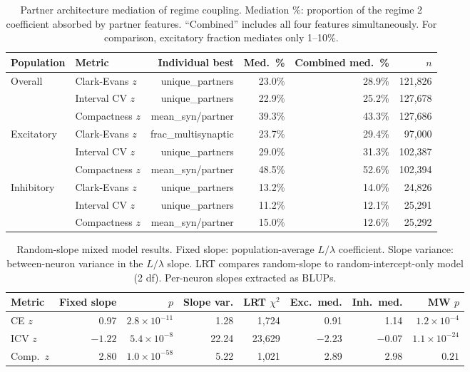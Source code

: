 \documentclass[11pt]{article}
\begin{document}
\begin{table}[H]
\centering
\caption{Partner architecture mediation of regime coupling. Mediation \%: proportion of the regime 2 coefficient absorbed by partner features. ``Combined'' includes all four features simultaneously. For comparison, excitatory fraction mediates only 1--10\%.}
\label{tab:partner_mediation}
\begin{tabular}{llrrrr}
\toprule
Population & Metric & Individual best & Med.\ \% & Combined med.\ \% & $n$ \\
\midrule
Overall & Clark-Evans $z$ & unique\_partners & 23.0\% & 28.9\% & 121,826 \\
 & Interval CV $z$ & unique\_partners & 22.9\% & 25.2\% & 127,678 \\
 & Compactness $z$ & mean\_syn/partner & 39.3\% & 43.3\% & 127,686 \\
\midrule
Excitatory & Clark-Evans $z$ & frac\_multisynaptic & 23.7\% & 29.4\% & 97,000 \\
 & Interval CV $z$ & unique\_partners & 29.0\% & 31.3\% & 102,387 \\
 & Compactness $z$ & mean\_syn/partner & 48.5\% & 52.6\% & 102,394 \\
\midrule
Inhibitory & Clark-Evans $z$ & unique\_partners & 13.2\% & 14.0\% & 24,826 \\
 & Interval CV $z$ & unique\_partners & 11.2\% & 12.1\% & 25,291 \\
 & Compactness $z$ & mean\_syn/partner & 15.0\% & 12.6\% & 25,292 \\
\bottomrule
\end{tabular}
\end{table}


\begin{table}[H]
\centering
\caption{Random-slope mixed model results. Fixed slope: population-average $L/\lambda$ coefficient. Slope variance: between-neuron variance in the $L/\lambda$ slope. LRT compares random-slope to random-intercept-only model (2 df). Per-neuron slopes extracted as BLUPs.}
\label{tab:random_slope}
\small
\begin{tabular}{lrrrr@{\hskip 8pt}rrr}
\toprule
Metric & Fixed slope & $p$ & Slope var. & LRT $\chi^2$ & Exc.\ med. & Inh.\ med. & MW $p$ \\
\midrule
CE $z$ & 0.97 & $2.8\!\times\!10^{-11}$ & 1.28 & 1,724 & 0.91 & 1.14 & $1.2\!\times\!10^{-4}$ \\
ICV $z$ & $-1.22$ & $5.4\!\times\!10^{-8}$ & 22.24 & 23,629 & $-2.23$ & $-0.07$ & $1.1\!\times\!10^{-24}$ \\
Comp.\ $z$ & 2.80 & $1.0\!\times\!10^{-58}$ & 5.22 & 1,021 & 2.89 & 2.98 & $0.21$ \\
\bottomrule
\end{tabular}
\end{table}
\end{document}
